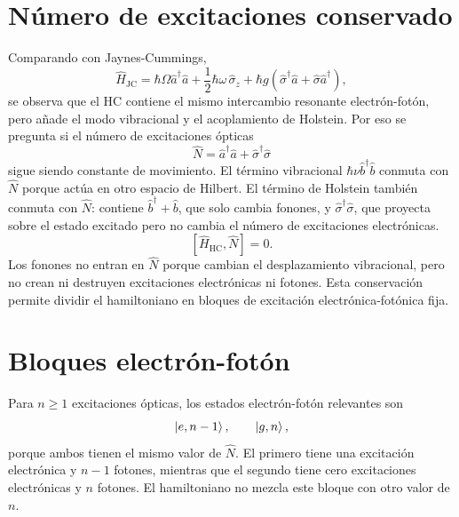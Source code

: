 \documentclass[11pt]{article}
\newcommand{\adag}{\hat a^\dagger}
\newcommand{\bdag}{\hat b^\dagger}
\newcommand{\sigmad}{\hat\sigma^\dagger}
\begin{document}
\section{N\'umero de excitaciones conservado}

Comparando con Jaynes-Cummings,
\begin{equation}
  \hat H_{\mathrm{JC}}
  =
  \hbar\Omega\adag\hat a
  +
  \frac{1}{2}\hbar\omega\,\hat\sigma_z
  +
  \hbar g(\sigmad\hat a+\hat\sigma\adag),
\end{equation}
se observa que el HC contiene el mismo intercambio resonante electr\'on-fot\'on,
pero a\~nade el modo vibracional y el acoplamiento de Holstein. Por eso se
pregunta si el n\'umero de excitaciones \'opticas
\begin{equation}
  \hat N=\adag\hat a+\sigmad\hat\sigma
\end{equation}
sigue siendo constante de movimiento. El t\'ermino vibracional
$\hbar\nu\bdag\hat b$ conmuta con $\hat N$ porque act\'ua en otro espacio de
Hilbert. El t\'ermino de Holstein tambi\'en conmuta con $\hat N$: contiene
$\bdag+\hat b$, que solo cambia fonones, y $\sigmad\hat\sigma$, que proyecta
sobre el estado excitado pero no cambia el n\'umero de excitaciones
electr\'onicas.
\begin{equation}
  \boxed{
  [\hat H_{\mathrm{HC}},\hat N]=0.
  }
\end{equation}
Los fonones no entran en $\hat N$ porque cambian el desplazamiento
vibracional, pero no crean ni destruyen excitaciones electr\'onicas ni fotones.
Esta conservaci\'on permite dividir el hamiltoniano en bloques de excitaci\'on
electr\'onica-fot\'onica fija.

\section{Bloques electr\'on-fot\'on}

Para $n\geq1$ excitaciones \'opticas, los estados electr\'on-fot\'on relevantes
son
\begin{equation}
  \ket{e,n-1},
  \qquad
  \ket{g,n},
\end{equation}
porque ambos tienen el mismo valor de $\hat N$. El primero tiene una
excitaci\'on electr\'onica y $n-1$ fotones, mientras que el segundo tiene cero
excitaciones electr\'onicas y $n$ fotones. El hamiltoniano no mezcla este
bloque con otro valor de $n$.
\end{document}
